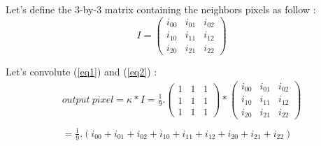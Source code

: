 \documentclass[12pt,a4paper]{article}
\begin{document}
\vspace{0.5cm}

Let's define the 3-by-3 matrix containing the neighbors pixels as follow :\\

\begin{equation}\label{eq2}
I = \begin{pmatrix}
i_{00} & i_{01} & i_{02} \\ 
i_{10} & i_{11} & i_{12} \\ 
i_{20} & i_{21} & i_{22}
\end{pmatrix}
\end{equation}

\vspace{0.5cm}

Let's convolute (\ref{eq1}) and (\ref{eq2}) :\\

\begin{equation}
\begin{matrix}
output ~ pixel = \kappa * I = \frac{1}{9} . \begin{pmatrix}
1 & 1 & 1 \\ 
1 & 1 & 1 \\ 
1 & 1 & 1
\end{pmatrix} * \begin{pmatrix}
i_{00} & i_{01} & i_{02} \\ 
i_{10} & i_{11} & i_{12} \\ 
i_{20} & i_{21} & i_{22}
\end{pmatrix}  \\ 
  \\
= \frac{1}{9}.(i_{00}+i_{01}+i_{02}+i_{10}+i_{11}+i_{12}+i_{20}+i_{21}+i_{22})
\end{matrix}
\end{equation}
\end{document}
